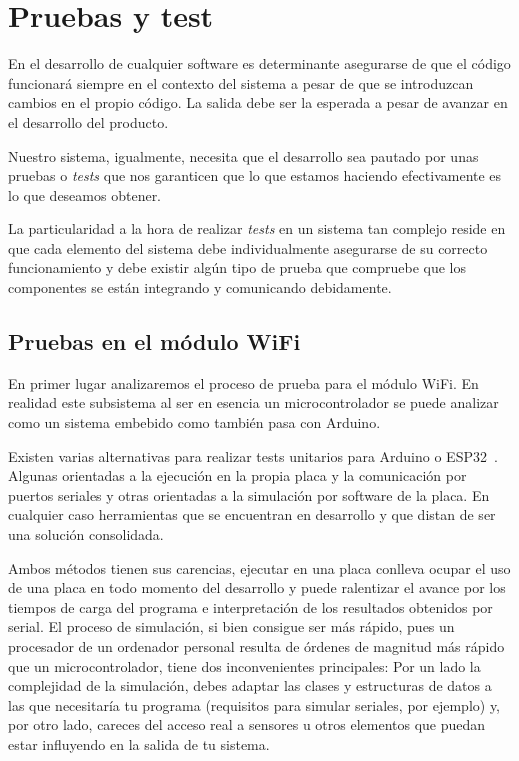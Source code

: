 \documentclass[a4paper,10pt]{article}
\begin{document}
\newpage

\section{Pruebas y test}\label{tests}

En el desarrollo de cualquier software es determinante asegurarse de
que el código funcionará siempre en el contexto del sistema a pesar de
que se introduzcan cambios en el propio código. La salida debe ser la
esperada a pesar de avanzar en el desarrollo del producto.

Nuestro sistema, igualmente, necesita que el desarrollo sea pautado
por unas pruebas o \textit{tests} que nos garanticen que lo que
estamos haciendo efectivamente es lo que deseamos obtener.

La particularidad a la hora de realizar \textit{tests} en un sistema
tan complejo reside en que cada elemento del sistema debe
individualmente asegurarse de su correcto funcionamiento y debe
existir algún tipo de prueba que compruebe que los componentes se
están integrando y comunicando debidamente.

\subsection{Pruebas en el módulo WiFi}

En primer lugar analizaremos el proceso de prueba para el módulo
WiFi. En realidad este subsistema al ser en esencia un
microcontrolador se puede analizar como un sistema embebido como
también pasa con Arduino.

Existen varias alternativas para realizar tests unitarios para
Arduino o ESP32~\cite{murdochMmurdochArduinounit2020,
  salmenrinneSusundbergArduinosimpleunittest2019}. Algunas orientadas
a la ejecución en la propia placa y la comunicación por puertos
seriales y otras orientadas a la simulación por software de la
placa. En cualquier caso herramientas que se encuentran en desarrollo
y que distan de ser una solución consolidada.

Ambos métodos tienen sus carencias, ejecutar en una placa conlleva
ocupar el uso de una placa en todo momento del desarrollo y puede
ralentizar el avance por los tiempos de carga del programa e
interpretación de los resultados obtenidos por serial. El proceso de
simulación, si bien consigue ser más rápido, pues un procesador de un
ordenador personal resulta de órdenes de magnitud más rápido que un
microcontrolador, tiene dos inconvenientes principales: Por un lado la
complejidad de la simulación, debes adaptar las clases y estructuras
de datos a las que necesitaría tu programa (requisitos para simular
seriales, por ejemplo) y, por otro lado, careces del acceso real a
sensores u otros elementos que puedan estar influyendo en la salida de
tu sistema.
\end{document}
